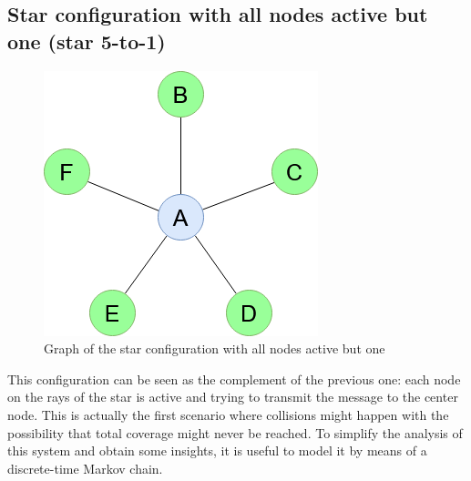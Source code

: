 \subsection{Star configuration with all nodes active but one (star 5-to-1)}
\label{ssec:star2}
\begin{figure}[H]
    \begin{center}
        \includegraphics[scale=0.5]{img/star_graph2.png}
        \caption{Graph of the star configuration with all nodes active but one}
        \label{fig:star5to1}
    \end{center}
\end{figure}
This configuration can be seen as the complement of the previous one: each node
on the rays of the star is active and trying to transmit the message to the
center node. This is actually the first scenario where collisions might happen
with the possibility that total coverage might never be reached. To simplify the
analysis of this system and obtain some insights, it is useful to model it by
means of a discrete-time Markov chain.
